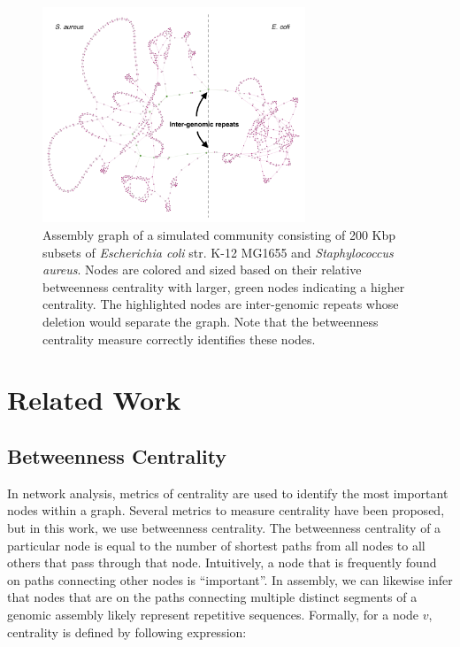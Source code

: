\documentclass[runningheads,a4paper]{llncs}
\begin{document}
\begin{figure}[htbp]
\centering
\includegraphics[width=0.70\textwidth]{es_mix_200kb_k21.png}
\caption{Assembly graph of a simulated community consisting of 200 Kbp subsets of \textit{Escherichia coli} str. K-12 MG1655 and \textit{Staphylococcus aureus}.  Nodes are colored and sized based on their relative betweenness centrality with larger, green nodes indicating a higher centrality. The highlighted nodes are inter-genomic repeats whose deletion would separate the graph. Note that the betweenness centrality measure correctly identifies these nodes.}
\label{fig:es_mix}
\end{figure}

\section{Related Work}

\subsection*{Betweenness Centrality}
In network analysis, metrics of centrality are used to identify the most important nodes within a graph. Several metrics to measure centrality have been proposed, but in this work, we use betweenness centrality. The betweenness centrality of a particular node is equal to the number of shortest paths from all nodes to all others that pass through that node. Intuitively, a node that is frequently found on paths connecting other nodes is ``important''.  In assembly, we can likewise infer that nodes that are on the paths connecting multiple distinct segments of a genomic assembly likely represent repetitive sequences.  Formally, for a node $v$, centrality is defined by following expression:
\end{document}
